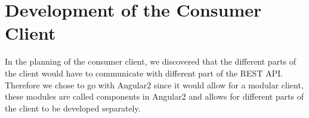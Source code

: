 \section{Development of the Consumer Client}\label{sec:DevelopmentConsumerClient}
In the planning of the consumer client, we discovered that the different parts of the client would have to communicate with different part of the REST API.
Therefore we chose to go with Angular2 since it would allow for a modular client, these modules are called components in Angular2 and allows for different parts of the client to be developed separately.
